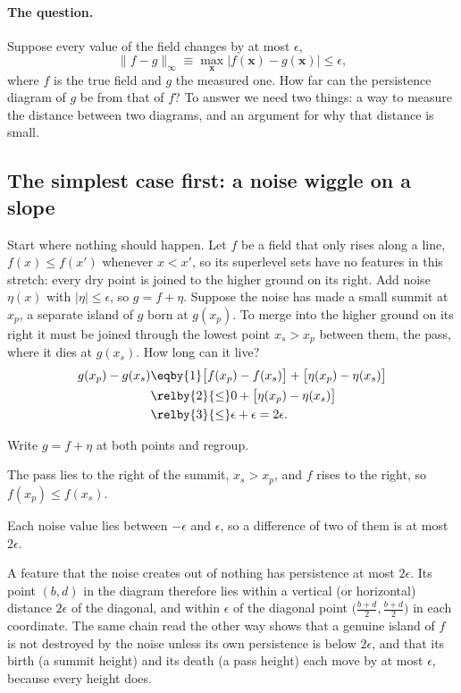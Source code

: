 \paragraph{The question.} Suppose every value of the field changes by at most $\epsilon$,
\begin{equation}
  \|f-g\|_\infty\equiv\max_{\bm x}|f(\bm x)-g(\bm x)|\leq\epsilon ,
  \label{12b:eq:supnorm}
\end{equation}
where $f$ is the true field and $g$ the measured one. How far can the persistence diagram of $g$ be from that of
$f$? To answer we need two things: a way to measure the distance between two diagrams, and an argument for
why that distance is small.

\subsection{The simplest case first: a noise wiggle on a slope}
\label{12b:sec:wiggle}

Start where nothing should happen. Let $f$ be a field that only rises along a line, $f(x)\leq f(x')$ whenever
$x<x'$, so its superlevel sets have no features in this stretch: every dry point is joined to the higher
ground on its right. Add noise $\eta(x)$ with $|\eta|\leq\epsilon$, so $g=f+\eta$. Suppose the noise has made a
small summit at $x_p$, a separate island of $g$ born at $g(x_p)$. To merge into the higher ground on its right
it must be joined through the lowest point $x_s>x_p$ between them, the pass, where it dies at $g(x_s)$. How
long can it live?
\begin{align}
  g(x_p)-g(x_s)
  &\eqby{1}\big[f(x_p)-f(x_s)\big]+\big[\eta(x_p)-\eta(x_s)\big]\nonumber\\
  &\relby{2}{\leq} 0+\big[\eta(x_p)-\eta(x_s)\big]\nonumber\\
  &\relby{3}{\leq} \epsilon+\epsilon=2\epsilon .
  \label{12b:eq:wiggle}
\end{align}
\begin{explain}
  \item Write $g=f+\eta$ at both points and regroup.
  \item The pass lies to the right of the summit, $x_s>x_p$, and $f$ rises to the right, so $f(x_p)\leq f(x_s)$.
  \item Each noise value lies between $-\epsilon$ and $\epsilon$, so a difference of two of them is at most
        $2\epsilon$.
\end{explain}
A feature that the noise creates out of nothing has persistence at most $2\epsilon$. Its point $(b,d)$ in the
diagram therefore lies within a vertical (or horizontal) distance $2\epsilon$ of the diagonal, and within
$\epsilon$ of the diagonal point $\big(\tfrac{b+d}2,\tfrac{b+d}2\big)$ in each coordinate. The same chain
read the other way shows that a genuine island of $f$ is not destroyed by the noise unless its own
persistence is below $2\epsilon$, and that its birth (a summit height) and its death (a pass height) each move
by at most $\epsilon$, because every height does.

